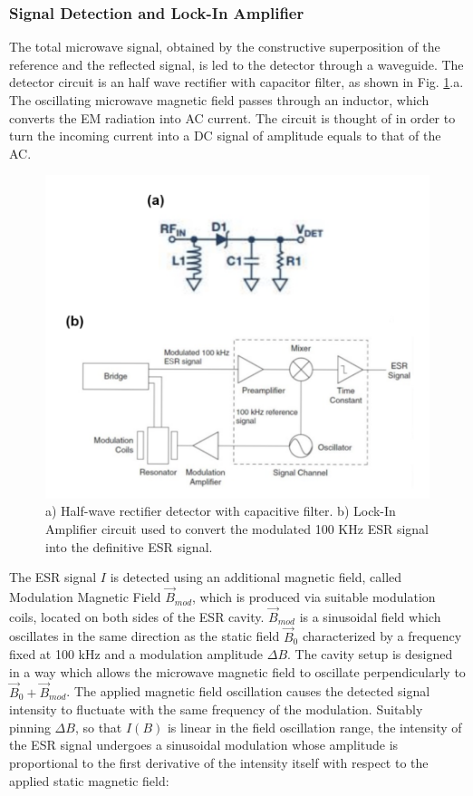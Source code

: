 \documentclass[journal]{IEEEtran}
\begin{document}
\subsubsection{Signal Detection and Lock-In Amplifier}

The total microwave signal, obtained by the constructive superposition of the reference and the reflected signal, is led to the detector through a waveguide. The detector circuit is an half wave rectifier with capacitor filter, as shown in Fig. \ref{fig:detector-lockInAmp}.a. The oscillating microwave magnetic field passes through an inductor, which converts the EM radiation into AC current. The circuit is thought of in order to turn the incoming current into a DC signal of amplitude equals to that of the AC.

\begin{figure}[h!]
    \centering
    \includegraphics[scale=0.35]{Lab2-diodo_lock-in.png}
    \caption{a) Half-wave rectifier detector with capacitive filter. b) Lock-In Amplifier circuit used to convert the modulated 100 KHz ESR signal into the definitive ESR signal.}
    \label{fig:detector-lockInAmp}
\end{figure}

\noindent The ESR signal $I$ is detected using an additional magnetic field, called Modulation Magnetic Field $\vec{B}_{mod}$, which is produced via suitable modulation coils, located on both sides of the ESR cavity. $\vec{B}_{mod}$ is a sinusoidal field which oscillates in the same direction as the static field $\vec{B}_{0}$ characterized by a frequency fixed at 100 kHz and a modulation amplitude $\Delta B$. The cavity setup is designed in a way which allows the microwave magnetic field to oscillate perpendicularly to $\vec{B}_{0}+\vec{B}_{mod}$. The applied magnetic field oscillation causes the detected signal intensity to fluctuate with the same frequency of the modulation. Suitably pinning $\Delta B$, so that $I(B)$ is linear in the field oscillation range, the intensity of the ESR signal undergoes a sinusoidal modulation whose amplitude is proportional to the first derivative of the intensity itself with respect to the applied static magnetic field: 
\end{document}
